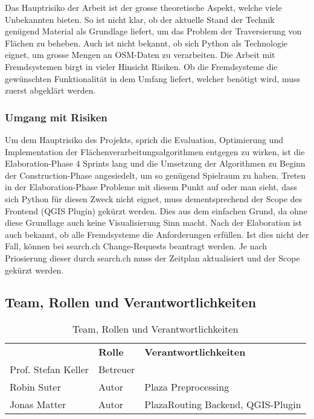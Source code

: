 Das Hauptrisiko der Arbeit ist der grosse theoretische Aspekt, welche viele Unbekannten bieten. So ist nicht klar, ob der aktuelle Stand der Technik genügend Material als Grundlage liefert, um das Problem der Traversierung von Flächen zu beheben. Auch ist nicht bekannt, ob sich Python als Technologie eignet, um grosse Mengen an \ac{OSM}-Daten zu verarbeiten. Die Arbeit mit Fremdsystemen birgt in vieler Hinsicht Risiken. Ob die Fremdsysteme die gewünschten Funktionalität in dem Umfang liefert, welcher benötigt wird, muss zuerst abgeklärt werden.

\subsubsection{Umgang mit Risiken}
\label{Risiken:Umang mit Risiken}
Um dem Hauptrisiko des Projekts, sprich die Evaluation, Optimierung und Implementation der Flächenverarbeitungsalgorithmen entgegen zu wirken, ist die Elaboration-Phase 4 Sprints lang und die Umsetzung der Algorithmen zu Beginn der Construction-Phase angesiedelt, um so genügend Spielraum zu haben. Treten in der Elaboration-Phase Probleme mit diesem Punkt auf oder man sieht, dass sich Python für diesen Zweck nicht eignet, muss dementsprechend der Scope des Frontend (QGIS Plugin) gekürzt werden. Dies aus dem einfachen Grund, da ohne diese Grundlage auch keine Visualisierung Sinn macht. Nach der Elaboration ist auch bekannt, ob alle Fremdsysteme die Anforderungen erfüllen. Ist dies nicht der Fall, können bei search.ch \cite{search_ch_route_api} Change-Requests beantragt werden. Je nach Priosierung dieser durch search.ch muss der Zeitplan aktualisiert und der Scope gekürzt werden.	

\subsection{Team, Rollen und Verantwortlichkeiten}
\label{sub:Team, Rollen und Verantwortlichkeiten}

\begin{table}[H]
    \centering
    \caption{Team, Rollen und Verantwortlichkeiten}
    \label{table: Team, Rollen und Verantwortlichkeiten}
    \begin{tabular}{lll}
        & \textbf{Rolle} & \textbf{Verantwortlichkeiten}    \\
        Prof. Stefan Keller  &        Betreuer                   &    \\
        Robin Suter          &        Autor                      & Plaza Preprocessing \\
        Jonas Matter         &        Autor                      & PlazaRouting Backend, QGIS-Plugin
    \end{tabular}
\end{table}